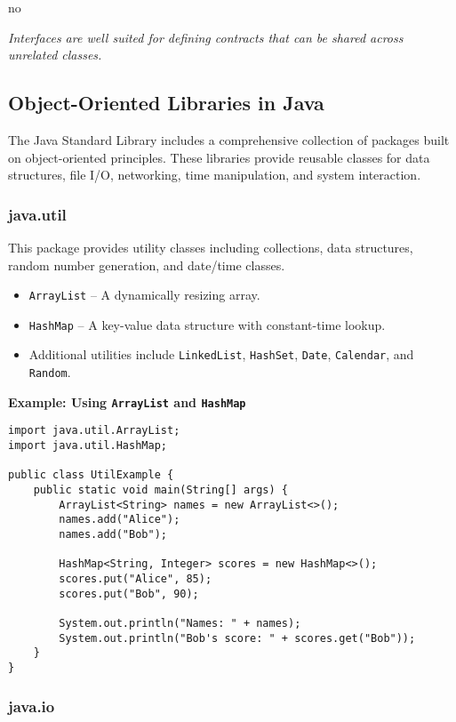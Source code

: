 no\documentclass{article}
\begin{document}
\medskip
\textit{Interfaces are well suited for defining contracts that can be shared across unrelated classes.}

\subsection{Object-Oriented Libraries in Java}

The Java Standard Library includes a comprehensive collection of packages built on object-oriented principles. These libraries provide reusable classes for data structures, file I/O, networking, time manipulation, and system interaction.

\subsubsection*{java.util}

This package provides utility classes including collections, data structures, random number generation, and date/time classes.

\begin{itemize}
    \item \texttt{ArrayList} – A dynamically resizing array.
    \item \texttt{HashMap} – A key-value data structure with constant-time lookup.
    \item Additional utilities include \texttt{LinkedList}, \texttt{HashSet}, \texttt{Date}, \texttt{Calendar}, and \texttt{Random}.
\end{itemize}

\noindent\textbf{Example: Using \texttt{ArrayList} and \texttt{HashMap}}
\begin{verbatim}
import java.util.ArrayList;
import java.util.HashMap;

public class UtilExample {
    public static void main(String[] args) {
        ArrayList<String> names = new ArrayList<>();
        names.add("Alice");
        names.add("Bob");

        HashMap<String, Integer> scores = new HashMap<>();
        scores.put("Alice", 85);
        scores.put("Bob", 90);

        System.out.println("Names: " + names);
        System.out.println("Bob's score: " + scores.get("Bob"));
    }
}
\end{verbatim}

\subsubsection*{java.io}
\end{document}
